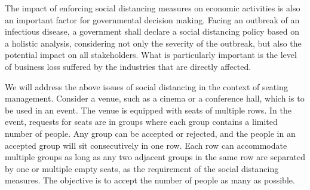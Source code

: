 The impact of enforcing social distancing measures on economic activities is also an important factor for governmental decision making. Facing an outbreak of an infectious disease, a government shall declare a social distancing policy based on a holistic analysis, considering not only the severity of the outbreak, but also the potential impact on all stakeholders. What is particularly important is the level of business loss suffered by the industries that are directly affected.  
 



We will address the above issues of social distancing in the context of seating management. Consider  a venue, such as a cinema or a conference hall, which is to be used in an event. The venue is equipped with seats of multiple rows. In the event, requests for seats are in groups where each group contains a limited number of people. Any group can be accepted or rejected, and the people in an accepted group  will sit consecutively in one row. Each row can accommodate multiple groups as long as any two adjacent groups in the same row are separated by one or multiple empty seats, as the requirement of the social distancing measures. The objective is to accept the  number of people as many as possible.

